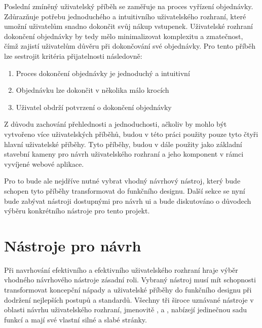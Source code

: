\newcommand{\userstorycheckout}{
}
\userstorycheckout

Poslední zmíněný uživatelský příběh se zaměřuje na proces vyřízení objednávky.
Zdůrazňuje potřebu jednoduchého a intuitivního uživatelského rozhraní, které umožní uživatelům snadno dokončit svůj nákup vstupenek.
Uživatelské rozhraní dokončení objednávky by tedy mělo minimalizovat komplexitu a zmatečnost, čímž zajistí uživatelům důvěru při dokončování své objednávky.
Pro tento příběh lze sestrojit kritéria přijatelnosti následovně:
\begin{enumerate}
    \item Proces dokončení objednávky je jednoduchý a intuitivní
    \item Objednávku lze dokončit v několika málo krocích
    \item Uživatel obdrží potvrzení o dokončení objednávky
\end{enumerate}

Z důvodu zachování přehlednosti a jednoduchosti, ačkoliv by mohlo být vytvořeno více uživatelských příběhů, budou v této práci použity pouze tyto čtyři hlavní uživatelské příběhy.
Tyto příběhy, budou v dále použity jako základní stavební kameny pro návrh uživatelského rozhraní a jeho komponent v rámci vyvíjené webové aplikace.

Pro to bude ale nejdříve nutné vybrat vhodný návrhový nástroj, který bude schopen tyto příběhy transformovat do funkčního designu.
Další sekce se nyní bude zabývat nástroji dostupnými pro návrh \ac{ui} a bude diskutováno o důvodech výběru konkrétního nástroje pro tento projekt.

\section{Nástroje pro návrh}
\label{sec:navrh-ui-nastroje}
Při navrhování efektivního a efektivního uživatelského rozhraní hraje výběr vhodného návrhového nástroje zásadní roli.
Vybraný nástroj musí mít schopnosti transformovat koncepční nápady a uživatelské příběhy do funkčního designu při dodržení nejlepších postupů a standardů.
Všechny tři široce uznávané nástroje v oblasti návrhu uživatelského rozhraní, jmenovitě ,  a , nabízejí jedinečnou sadu funkcí a mají své vlastní silné a slabé stránky.

